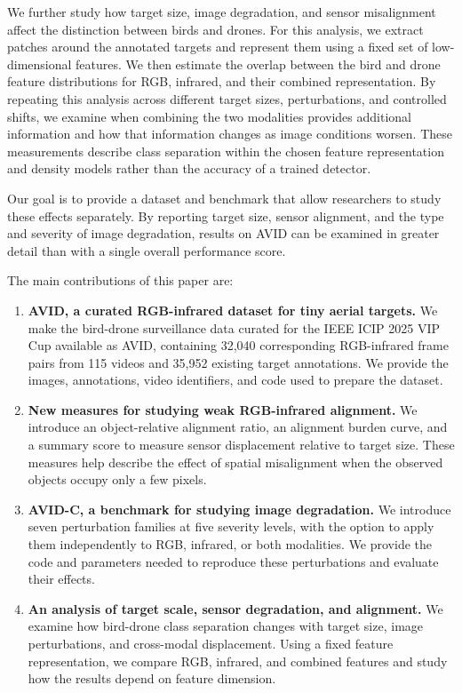 \documentclass[10pt]{article}
\newcommand{\dataset}{\textsc{AVID}}
\newcommand{\corrupt}{\textsc{AVID-C}}
\begin{document}
We further study how target size, image degradation, and sensor misalignment affect the distinction between birds and drones. For this analysis, we extract patches around the annotated targets and represent them using a fixed set of low-dimensional features. We then estimate the overlap between the bird and drone feature distributions for RGB, infrared, and their combined representation. By repeating this analysis across different target sizes, perturbations, and controlled shifts, we examine when combining the two modalities provides additional information and how that information changes as image conditions worsen. These measurements describe class separation within the chosen feature representation and density models rather than the accuracy of a trained detector.

Our goal is to provide a dataset and benchmark that allow researchers to study these effects separately. By reporting target size, sensor alignment, and the type and severity of image degradation, results on \dataset{} can be examined in greater detail than with a single overall performance score.

The main contributions of this paper are:

\begin{enumerate}

    \item \textbf{\dataset{}, a curated RGB-infrared dataset for tiny aerial targets.}
    We make the bird-drone surveillance data curated for the IEEE ICIP 2025 VIP Cup available as \dataset{}, containing 32,040 corresponding RGB-infrared frame pairs from 115 videos and 35,952 existing target annotations. We provide the images, annotations, video identifiers, and code used to prepare the dataset.

    \item \textbf{New measures for studying weak RGB-infrared alignment.}
    We introduce an object-relative alignment ratio, an alignment burden curve, and a summary score to measure sensor displacement relative to target size. These measures help describe the effect of spatial misalignment when the observed objects occupy only a few pixels.

    \item \textbf{\corrupt{}, a benchmark for studying image degradation.}
    We introduce seven perturbation families at five severity levels, with the option to apply them independently to RGB, infrared, or both modalities. We provide the code and parameters needed to reproduce these perturbations and evaluate their effects.

    \item \textbf{An analysis of target scale, sensor degradation, and alignment.}
    We examine how bird-drone class separation changes with target size, image perturbations, and cross-modal displacement. Using a fixed feature representation, we compare RGB, infrared, and combined features and study how the results depend on feature dimension.

\end{enumerate}
\end{document}
